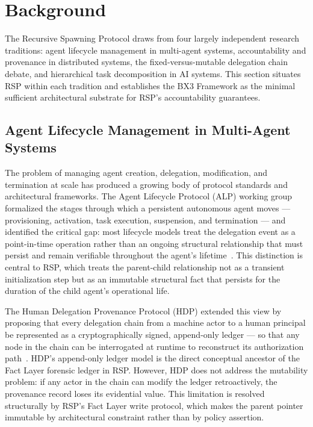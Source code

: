 \section{Background}
\label{sec:rs-background}

The Recursive Spawning Protocol draws from four largely independent research traditions: agent lifecycle management in multi-agent systems, accountability and provenance in distributed systems, the fixed-versus-mutable delegation chain debate, and hierarchical task decomposition in AI systems. This section situates RSP within each tradition and establishes the BX3 Framework as the minimal sufficient architectural substrate for RSP's accountability guarantees.

\subsection{Agent Lifecycle Management in Multi-Agent Systems}

The problem of managing agent creation, delegation, modification, and termination at scale has produced a growing body of protocol standards and architectural frameworks. The Agent Lifecycle Protocol (ALP) working group formalized the stages through which a persistent autonomous agent moves — provisioning, activation, task execution, suspension, and termination — and identified the critical gap: most lifecycle models treat the delegation event as a point-in-time operation rather than an ongoing structural relationship that must persist and remain verifiable throughout the agent's lifetime~\citep{alp2025}. This distinction is central to RSP, which treats the parent-child relationship not as a transient initialization step but as an immutable structural fact that persists for the duration of the child agent's operational life.

The Human Delegation Provenance Protocol (HDP) extended this view by proposing that every delegation chain from a machine actor to a human principal be represented as a cryptographically signed, append-only ledger — so that any node in the chain can be interrogated at runtime to reconstruct its authorization path~\citep{hdp-draft,helixar2025hdp2,hdp-draft-2}. HDP's append-only ledger model is the direct conceptual ancestor of the Fact Layer forensic ledger in RSP. However, HDP does not address the mutability problem: if any actor in the chain can modify the ledger retroactively, the provenance record loses its evidential value. This limitation is resolved structurally by RSP's Fact Layer write protocol, which makes the parent pointer immutable by architectural constraint rather than by policy assertion.

